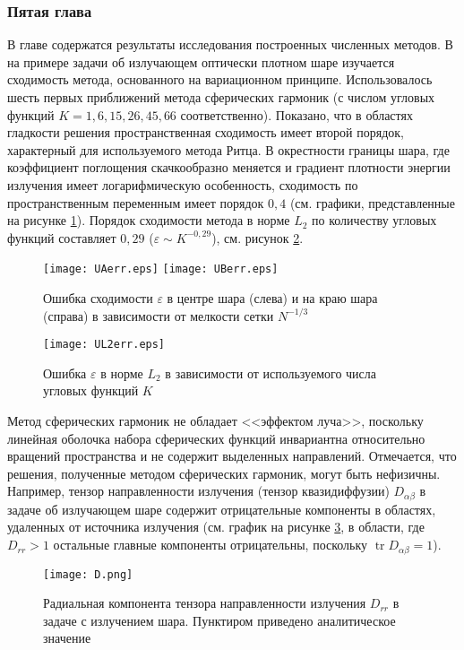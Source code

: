 \subsubsection*{Пятая глава}
В главе содержатся результаты исследования построенных численных методов. В
 на примере задачи об излучающем оптически плотном шаре
изучается сходимость метода, основанного на вариационном принципе. Использовалось шесть первых приближений метода сферических гармоник (с числом угловых функций $K = 1, 6, 15, 26, 45, 66$ соответственно).
Показано, что в областях гладкости решения пространственная сходимость имеет второй порядок, характерный для используемого метода Ритца. В окрестности границы шара, где коэффициент поглощения скачкообразно меняется и градиент плотности энергии излучения имеет логарифмическую особенность, сходимость по пространственным переменным имеет порядок $0,4$ (см. графики, представленные на рисунке \ref{fig:sphconv}). Порядок сходимости метода в норме $L_2$ по количеству угловых функций составляет $0,29$ ($\varepsilon \sim K^{-0,29}$), см. рисунок \ref{fig:angconv}.
\begin{figure}[ht!]
\centering
\texttt{[image: UAerr.eps]}
\texttt{[image: UBerr.eps]}
\caption{Ошибка сходимости $\varepsilon$ в центре шара (слева) и на краю шара (справа) в зависимости от мелкости сетки $N^{-1/3}$}
\label{fig:sphconv}
\end{figure}
\begin{figure}[ht!]
\centering
\texttt{[image: UL2err.eps]}
\caption{Ошибка $\varepsilon$ в норме $L_2$ в зависимости от используемого числа угловых функций $K$}
\label{fig:angconv}
\end{figure}

Метод сферических гармоник не обладает <<эффектом луча>>, поскольку линейная оболочка набора сферических функций инвариантна относительно вращений пространства и не содержит выделенных направлений.
Отмечается, что решения, полученные методом сферических гармоник, могут быть нефизичны. Например, тензор направленности излучения (тензор квазидиффузии) $D_{\alpha \beta}$ в задаче об излучающем шаре содержит отрицательные компоненты в областях, удаленных от источника излучения (см. график на рисунке \ref{fig:Drr}, в области, где $D_{rr} > 1$ остальные главные компоненты отрицательны, поскольку $\operatorname{tr} D_{\alpha\beta} = 1$). 
\begin{figure}[ht!]
\centering
\texttt{[image: D.png]}
\caption{Радиальная компонента тензора направленности излучения $D_{rr}$ в задаче с излучением шара. Пунктиром приведено аналитическое значение}
\label{fig:Drr}
\end{figure}


